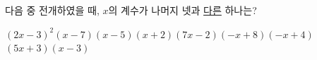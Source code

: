 다음 중 전개하였을 때, $x$의 계수가 나머지 넷과 \underline{다른} 하나는?
\begin{choicesii}{$(2x-3)^2$}{$(x-7)(x-5)$}{$(x+2)(7x-2)$}{$(-x+8)(-x+4)$}{$(5x+3)(x-3)$}\end{choicesii}
